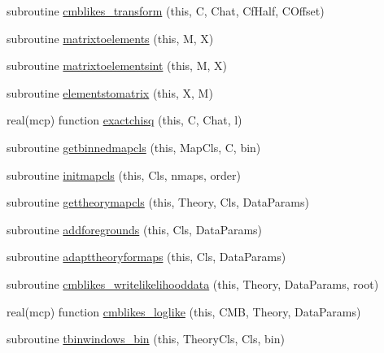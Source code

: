 \begin{DoxyCompactItemize}
\item 
subroutine \mbox{\hyperlink{namespacecmblikes_a94f791a78bfa0b35f813dc792796de0d}{cmblikes\+\_\+transform}} (this, C, Chat, Cf\+Half, C\+Offset)
\item 
subroutine \mbox{\hyperlink{namespacecmblikes_a16be2c18f3fecf43964ef1f2995dcd4e}{matrixtoelements}} (this, M, X)
\item 
subroutine \mbox{\hyperlink{namespacecmblikes_a908a9bb9c69b1ef3a8b7df6519fd4641}{matrixtoelementsint}} (this, M, X)
\item 
subroutine \mbox{\hyperlink{namespacecmblikes_a2ae7731bcaed3a30ef1314fdb6c7718e}{elementstomatrix}} (this, X, M)
\item 
real(mcp) function \mbox{\hyperlink{namespacecmblikes_a5ece500a732974850cb05902f8df7f16}{exactchisq}} (this, C, Chat, l)
\item 
subroutine \mbox{\hyperlink{namespacecmblikes_aeac358ca50ccdbdddc8f40af418cc6e5}{getbinnedmapcls}} (this, Map\+Cls, C, bin)
\item 
subroutine \mbox{\hyperlink{namespacecmblikes_a324d03e811c50f8dcc382819daa2adac}{initmapcls}} (this, Cls, nmaps, order)
\item 
subroutine \mbox{\hyperlink{namespacecmblikes_a887e1b2647525630e45abcf6e96ffb13}{gettheorymapcls}} (this, Theory, Cls, Data\+Params)
\item 
subroutine \mbox{\hyperlink{namespacecmblikes_a6653a1b9a17f3c0c4d5025a40de7d134}{addforegrounds}} (this, Cls, Data\+Params)
\item 
subroutine \mbox{\hyperlink{namespacecmblikes_a3015ed6ed745619906f28edd67ff390c}{adapttheoryformaps}} (this, Cls, Data\+Params)
\item 
subroutine \mbox{\hyperlink{namespacecmblikes_a9befa7145c3914eb9bdd86699681274c}{cmblikes\+\_\+writelikelihooddata}} (this, Theory, Data\+Params, root)
\item 
real(mcp) function \mbox{\hyperlink{namespacecmblikes_a97fb12e9b7c8a1059a8443b1b0423c24}{cmblikes\+\_\+loglike}} (this, C\+MB, Theory, Data\+Params)
\item 
subroutine \mbox{\hyperlink{namespacecmblikes_a84faea71532b47138544e07bf77a7fb0}{tbinwindows\+\_\+bin}} (this, Theory\+Cls, Cls, bin)
\end{DoxyCompactItemize}
